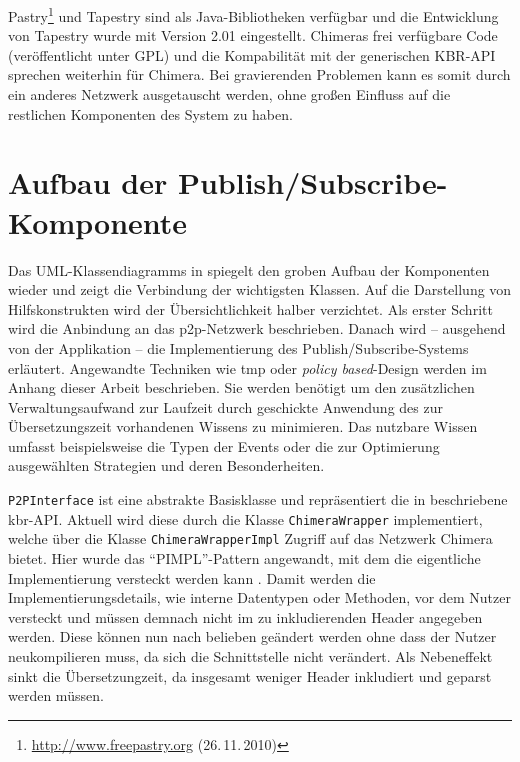 Pastry\footnote{\url{http://www.freepastry.org} (26.\,11.\,2010)} und Tapestry sind als Java-Bibliotheken verfügbar und die Entwicklung von Tapestry wurde mit Version 2.01 eingestellt. Chimeras frei verfügbare Code (veröffentlicht unter GPL) und die Kompabilität mit der generischen KBR-API sprechen weiterhin für Chimera. Bei gravierenden Problemen kann es somit durch ein anderes Netzwerk ausgetauscht werden, ohne großen Einfluss auf die restlichen Komponenten des System zu haben. 


\section{Aufbau der Publish/Subscribe-Komponente}

Das UML-Klassendiagramms in  spiegelt den groben Aufbau der Komponenten wieder und zeigt die Verbindung der wichtigsten Klassen. Auf die Darstellung von Hilfskonstrukten wird der Übersichtlichkeit halber verzichtet. Als erster Schritt wird die Anbindung an das \ac{p2p}-Netzwerk beschrieben. Danach wird -- ausgehend von der Applikation -- die Implementierung des Publish/Subscribe-Systems erläutert. Angewandte Techniken wie \ac{tmp} oder \emph{policy based}-Design werden im Anhang dieser Arbeit beschrieben. Sie werden benötigt um den zusätzlichen Verwaltungsaufwand zur Laufzeit durch geschickte Anwendung des zur Übersetzungszeit vorhandenen Wissens zu minimieren. Das nutzbare Wissen umfasst beispielsweise die Typen der Events oder die zur Optimierung ausgewählten Strategien und deren Besonderheiten.

\texttt{P2PInterface} ist eine abstrakte Basisklasse und repräsentiert die in  beschriebene \ac{kbr}-API. Aktuell wird diese durch die Klasse \texttt{ChimeraWrapper} implementiert, welche über die Klasse \texttt{ChimeraWrapperImpl} Zugriff auf das Netzwerk Chimera bietet. Hier wurde das \enquote{PIMPL}-Pattern angewandt, mit dem die eigentliche Implementierung versteckt werden kann \cite{Alexandrescu2001Modern}. Damit werden die Implementierungsdetails, wie interne Datentypen oder Methoden, vor dem Nutzer versteckt und müssen demnach nicht im zu inkludierenden Header angegeben werden. Diese können nun nach belieben geändert werden ohne dass der Nutzer neukompilieren muss, da sich die Schnittstelle nicht verändert. Als Nebeneffekt sinkt die Übersetzungzeit, da insgesamt weniger Header inkludiert und geparst werden müssen.

